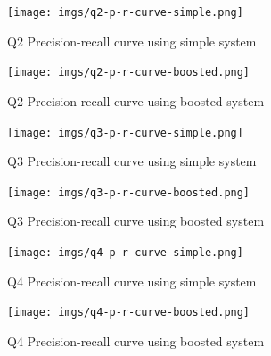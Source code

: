 \documentclass[sigconf]{acmart}
\begin{document}
\begin{figure}[H]
  \centering
  \texttt{[image: imgs/q2-p-r-curve-simple.png]}
  \caption{Q2 Precision-recall curve using simple system}
  \label{fig:q2_simple}
\end{figure}

\begin{figure}[H]
  \centering
  \texttt{[image: imgs/q2-p-r-curve-boosted.png]}
  \caption{Q2 Precision-recall curve using boosted system}
  \label{fig:q2_boosted}
\end{figure}

\begin{figure}[H]
  \centering
  \texttt{[image: imgs/q3-p-r-curve-simple.png]}
  \caption{Q3 Precision-recall curve using simple system}
  \label{fig:q3_simple}
\end{figure}

\begin{figure}[H]
  \centering
  \texttt{[image: imgs/q3-p-r-curve-boosted.png]}
  \caption{Q3 Precision-recall curve using boosted system}
  \label{fig:q3_boosted}
\end{figure}

\begin{figure}[H]
  \centering
  \texttt{[image: imgs/q4-p-r-curve-simple.png]}
  \caption{Q4 Precision-recall curve using simple system}
  \label{fig:q4_simple}
\end{figure}

\begin{figure}[H]
  \centering
  \texttt{[image: imgs/q4-p-r-curve-boosted.png]}
  \caption{Q4 Precision-recall curve using boosted system}
  \label{fig:q4_boosted}
\end{figure}
\end{document}
